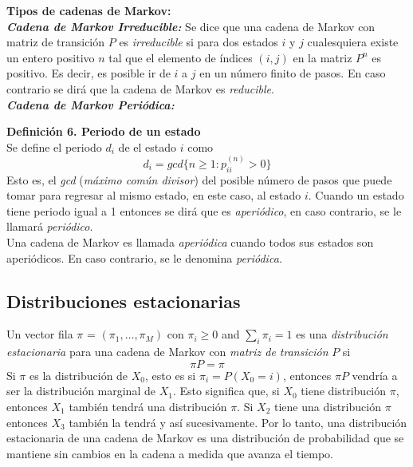\documentclass[10pt,a4paper]{article}
\theoremstyle{definition}
\theoremstyle{remark}
\begin{document}
\begin{multicols}{2}
\noindent \textbf{Tipos de cadenas de Markov:}\\

\textbf{\textit{Cadena de Markov Irreducible:}}
Se dice que una cadena de Markov con matriz de transición $P$ es \textit{irreducible} si para dos estados $i$ y $j$ cualesquiera existe un entero positivo $n$ tal que el elemento de índices $(i,j)$ en la matriz $P^n$ es positivo. Es decir, es posible ir de $i$ a $j$ en un número finito de pasos. En caso contrario se dirá que la cadena de Markov es \textit{reducible}.\\

\textbf{\textit{Cadena de Markov Periódica:}}
\vspace*{0.25cm}

\textbf{Definición 6. Periodo de un estado}\\
Se define el periodo $d_{i}$ de el estado $i$ como
\[
d_{i} = gcd\{n\geq1:p_{ii}^{(n)}>0\}
\]
Esto es, el \textit{gcd} (\textit{máximo común divisor}) del posible número de pasos que puede tomar para regresar al mismo estado, en este caso, al estado $i$. 
Cuando un estado tiene periodo igual a 1 entonces se dirá que es \textit{aperiódico}, en caso contrario, se le llamará \textit{periódico}.\\
Una cadena de Markov es llamada \textit{aperiódica} cuando todos sus estados son aperiódicos. En caso contrario, se le denomina \textit{periódica.}

\subsection{Distribuciones estacionarias}
\noindent Un vector fila $\pi$ = $(\pi_{1},\dots,\pi_{M})$ con $\pi_{i}\geq0$ and $\sum_{i}\pi_{i} = 1$ es una \textit{distribución estacionaria} para una cadena de Markov con \textit{matriz de transición} $P$ si
\[
\pi P = \pi
\]
Si $\pi$ es la distribución de $X_{0}$, esto es si $\pi_{i} = P(X_{0} = i)$, entonces $\pi P$ vendría a ser la distribución marginal de $X_{1}$. Esto significa que, si $X_{0}$ tiene distribución $\pi$, entonces $X_{1}$ también tendrá una distribución $\pi$. Si $X_{2}$ tiene una distribución $\pi$ entonces $X_{3}$ también la tendrá y así sucesivamente.
Por lo tanto, una distribución estacionaria de una cadena de Markov es una distribución de probabilidad que se mantiene sin cambios en la cadena a medida que avanza el tiempo.



\end{multicols}
\end{document}

